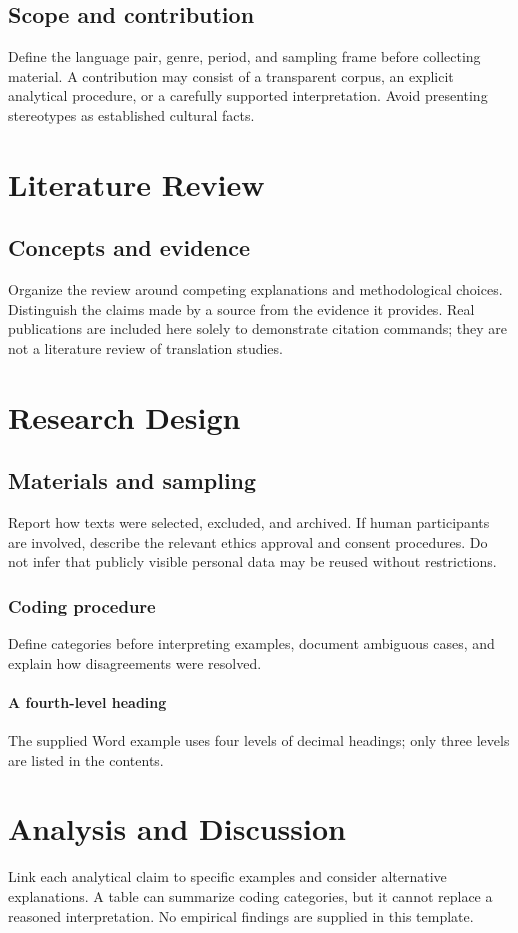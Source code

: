 \subsection{Scope and contribution}
Define the language pair, genre, period, and sampling frame before collecting material. A contribution may consist of a transparent corpus, an explicit analytical procedure, or a carefully supported interpretation. Avoid presenting stereotypes as established cultural facts.
\section{Literature Review}
\subsection{Concepts and evidence}
Organize the review around competing explanations and methodological choices. Distinguish the claims made by a source from the evidence it provides. Real publications are included here solely to demonstrate citation commands\cite{knuth1984,lamport1994}; they are not a literature review of translation studies.
\section{Research Design}
\subsection{Materials and sampling}
Report how texts were selected, excluded, and archived. If human participants are involved, describe the relevant ethics approval and consent procedures. Do not infer that publicly visible personal data may be reused without restrictions.
\subsubsection{Coding procedure}
Define categories before interpreting examples, document ambiguous cases, and explain how disagreements were resolved.
\paragraph{A fourth-level heading}
The supplied Word example uses four levels of decimal headings; only three levels are listed in the contents.
\section{Analysis and Discussion}
Link each analytical claim to specific examples and consider alternative explanations. A table can summarize coding categories, but it cannot replace a reasoned interpretation. No empirical findings are supplied in this template.
